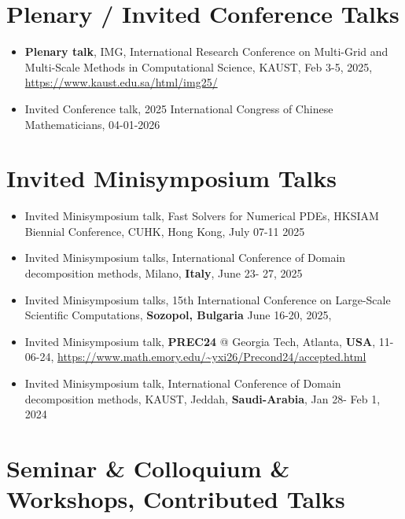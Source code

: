 \documentclass[letterpaper]{article}
\begin{document}
\section*{Plenary / Invited Conference Talks}
\begin{itemize}[leftmargin=*]
\item {\bf Plenary talk}, IMG, International Research Conference on Multi-Grid and Multi-Scale Methods in Computational Science, KAUST, Feb 3-5, 2025, \url{https://www.kaust.edu.sa/html/img25/}

\item Invited Conference talk, 2025 International Congress of Chinese Mathematicians, 04-01-2026



\end{itemize}


\section*{Invited Minisymposium Talks}

\begin{itemize}[leftmargin=*]


 
\item Invited  Minisymposium talk, Fast Solvers for Numerical PDEs, HKSIAM Biennial Conference, CUHK, Hong Kong, July 07-11 2025


\item Invited Minisymposium  talks, International Conference of Domain decomposition methods, Milano, {\bf Italy}, June 23- 27, 2025



\item Invited Minisymposium  talks,  15th International Conference on Large-Scale Scientific Computations, {\bf  Sozopol, Bulgaria}
June 16-20, 2025,


\item  Invited  Minisymposium talk,  {\bf PREC24} @ Georgia Tech, Atlanta, {\bf  USA}, 11-06-24, \url{https://www.math.emory.edu/~yxi26/Precond24/accepted.html}


\item Invited Minisymposium talk, International Conference of Domain decomposition methods, KAUST, Jeddah, {\bf Saudi-Arabia}, Jan 28- Feb 1, 2024


\end{itemize}

\section*{ Seminar \& Colloquium \& Workshops, Contributed Talks}
\end{document}
